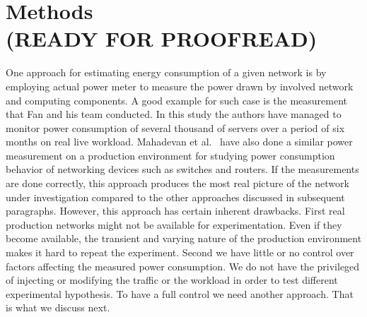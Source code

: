 \chapter{Methods\\(READY FOR PROOFREAD)}
\label{chapter:methods}
One approach for estimating energy consumption of a given network is by employing actual power meter to measure the power drawn by involved network and computing components. A good example for such case is the measurement that Fan and his team conducted\cite{DBLP:conf/isca/FanWB07}. In this study the authors have managed to monitor power consumption of several thousand of servers over a period of six months on real live workload. Mahadevan et al.{\ } have also done a similar power measurement on a production environment for studying power consumption behavior of networking devices such as switches and routers. If the measurements are done correctly, this approach produces the most real picture of the network under investigation compared to the other approaches discussed in subsequent paragraphs. However, this approach has certain inherent drawbacks. First real production networks might not be available for experimentation. Even if they become available, the transient and varying nature of the production environment makes it hard to repeat the experiment. Second we have little or no control over factors affecting the measured power consumption. We do not have the privileged of injecting or modifying the traffic or the workload in order to test different experimental hypothesis. To have a full control we need another approach. That is what we discuss next.

